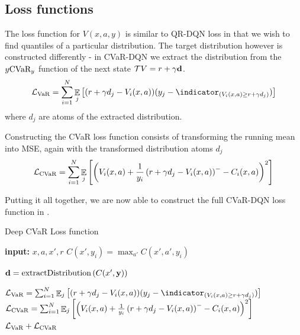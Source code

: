 \subsection{Loss functions}
The loss function for $V(x, a, y)$ is similar to QR-DQN loss in that we wish to find quantiles of a particular distribution. The target distribution however is constructed differently - in CVaR-DQN we extract the distribution from the $y\text{CVaR}_y$ function of the next state $\mathcal{T} V = r + \gamma \mathbf{d}$.
\begin{equation}
\mathcal{L}_{\var}=\sum_{i=1}^{N} \expect_j\bsquare{(r + \gamma d_j - V_i(x, a))(y_j - \indicator_{(V_i(x, a) \ge r + \gamma d_j)})}
\end{equation}
where $d_j$ are atoms of the extracted distribution.

Constructing the CVaR loss function consists of transforming the running mean into MSE, again with the transformed distribution atoms $d_j$
\begin{equation}
\mathcal{L}_{\text{CVaR}}=\sum_{i=1}^{N} \mathop{\mathbb{E}}_j\left[ {\left( {V_i(x, a) + \frac{1}{y_i} \left( {r + \gamma d_j - V_i(x, a)} \right)^- - C_i(x, a)} \right)^2} \right]
\end{equation}


Putting it all together, we are now able to construct the full CVaR-DQN loss function in .

\begin{algorithm}
\caption{Deep CVaR Loss function}
\begin{algorithmic}\label{alg:cvardqnloss}

    \STATE \textbf{input:} $x, a, x', r$
    \bindent
	\STATE $C(x', y_i) = \max_{a'} C(x', a', y_i)$
	\ENDFOR
	
	\STATE $\mathbf{d}= \text{extractDistribution}\left( {C(x', \mathbf{y})} \right)$

	
	\STATE $\mathcal{L}_{\var}=\sum_{i=1}^{N} \expect_j\bsquare{(r + \gamma d_j - V_i(x, a))(y_j - \indicator_{(V_i(x, a) \ge r + \gamma d_j)})}$
	\STATE $\mathcal{L}_{\text{CVaR}}=\sum_{i=1}^{N} \mathop{\mathbb{E}}_j\left[ {\left( {V_i(x, a) + \frac{1}{y_i} \left( {r + \gamma d_j - V_i(x, a)} \right)^- - C_i(x, a)} \right)^2} \right]$
	\eindent
	\RETURN $\mathcal{L}_{\text{VaR}} + \mathcal{L}_{\text{CVaR}}$
	
\end{algorithmic}
\end{algorithm}

